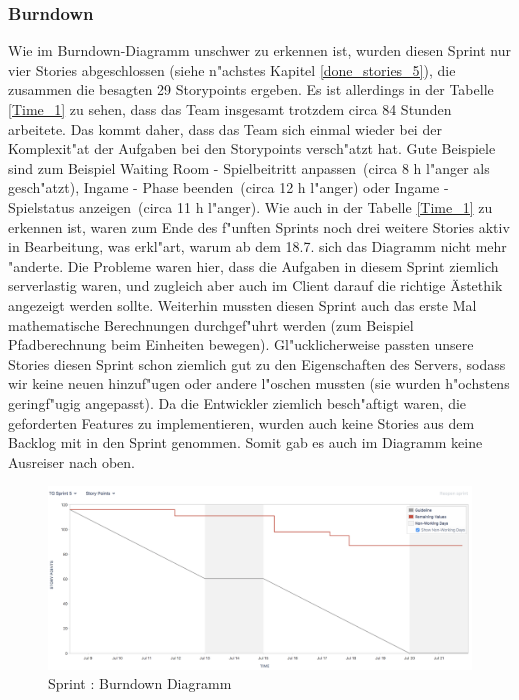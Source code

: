 \documentclass[12pt, titlepage]{scrartcl}
\newcommand{\RN}[1]{%
	\textup{\uppercase\expandafter{\romannumeral#1}}%
}
\begin{document}
        	\subsubsection{Burndown}
        		Wie im Burndown-Diagramm unschwer zu erkennen ist, wurden diesen Sprint nur vier Stories abgeschlossen (siehe n"achstes Kapitel \ref{done_stories_5}), die zusammen die besagten 29 Storypoints ergeben. Es ist allerdings in der Tabelle \ref{Time_1} zu sehen, dass das Team insgesamt trotzdem circa 84 Stunden arbeitete. Das kommt daher, dass das Team sich einmal wieder bei der Komplexit"at der Aufgaben bei den Storypoints versch"atzt hat. Gute Beispiele sind zum Beispiel \glqq Waiting Room - Spielbeitritt anpassen\grqq\ (circa 8 h l"anger als gesch"atzt), \glqq Ingame - Phase beenden\grqq\ (circa 12 h l"anger) oder \glqq Ingame - Spielstatus anzeigen\grqq\ (circa 11 h l"anger). Wie auch in der Tabelle \ref{Time_1} zu erkennen ist, waren zum Ende des f"unften Sprints noch drei weitere Stories aktiv in Bearbeitung, was erkl"art, warum ab dem 18.7. sich das Diagramm nicht mehr "anderte. Die Probleme waren hier, dass die Aufgaben in diesem Sprint ziemlich serverlastig waren, und zugleich aber auch im Client darauf die richtige \"Astethik angezeigt werden sollte. Weiterhin mussten diesen Sprint auch das erste Mal mathematische Berechnungen durchgef"uhrt werden (zum Beispiel Pfadberechnung beim Einheiten bewegen). Gl"ucklicherweise passten unsere Stories diesen Sprint schon ziemlich gut zu den Eigenschaften des Servers, sodass wir keine neuen hinzuf"ugen oder andere l"oschen mussten (sie wurden h"ochstens geringf"ugig angepasst). Da die Entwickler ziemlich besch"aftigt waren, die geforderten Features zu implementieren, wurden auch keine Stories aus dem Backlog mit in den Sprint genommen. Somit gab es auch im Diagramm keine Ausreiser nach oben.
	        	\begin{figure}[H] 
	        		\centering
	        		\includegraphics[width=\textwidth]{images/sprintV/burndown.png}
	        		\caption{Sprint \RN{5}: Burndown Diagramm}
	        		\label{Burndown_5}
	        	\end{figure} 
\end{document}
